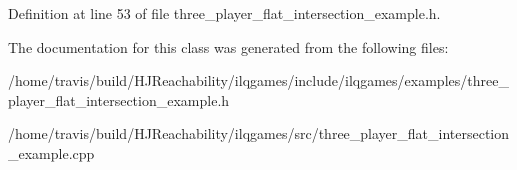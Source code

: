 Definition at line 53 of file three\+\_\+player\+\_\+flat\+\_\+intersection\+\_\+example.\+h.



The documentation for this class was generated from the following files\+:\begin{DoxyCompactItemize}
\item 
/home/travis/build/\+H\+J\+Reachability/ilqgames/include/ilqgames/examples/three\+\_\+player\+\_\+flat\+\_\+intersection\+\_\+example.\+h\item 
/home/travis/build/\+H\+J\+Reachability/ilqgames/src/three\+\_\+player\+\_\+flat\+\_\+intersection\+\_\+example.\+cpp\end{DoxyCompactItemize}
